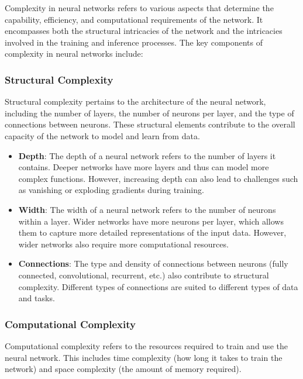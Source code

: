 \documentclass[11pt,a4paper]{article}
\begin{document}
Complexity in neural networks refers to various aspects that determine the capability, efficiency, and computational requirements of the network. It encompasses both the structural intricacies of the network and the intricacies involved in the training and inference processes. The key components of complexity in neural networks include:

\subsubsection{Structural Complexity}

Structural complexity pertains to the architecture of the neural network, including the number of layers, the number of neurons per layer, and the type of connections between neurons. These structural elements contribute to the overall capacity of the network to model and learn from data.

\begin{itemize}
    \item \textbf{Depth}: The depth of a neural network refers to the number of layers it contains. Deeper networks have more layers and thus can model more complex functions. However, increasing depth can also lead to challenges such as vanishing or exploding gradients during training.
    
    \item \textbf{Width}: The width of a neural network refers to the number of neurons within a layer. Wider networks have more neurons per layer, which allows them to capture more detailed representations of the input data. However, wider networks also require more computational resources.
    
    \item \textbf{Connections}: The type and density of connections between neurons (fully connected, convolutional, recurrent, etc.) also contribute to structural complexity. Different types of connections are suited to different types of data and tasks.
\end{itemize}

\subsubsection{Computational Complexity}

Computational complexity refers to the resources required to train and use the neural network. This includes time complexity (how long it takes to train the network) and space complexity (the amount of memory required).
\end{document}
